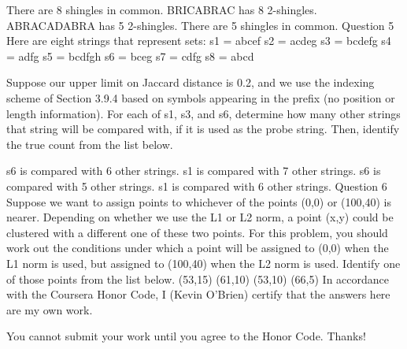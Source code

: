 There are 8 shingles in common.
BRICABRAC has 8 2-shingles.
ABRACADABRA has 5 2-shingles.
There are 5 shingles in common.
Question 5
Here are eight strings that represent sets:
s1 = abcef
s2 = acdeg
s3 = bcdefg
s4 = adfg
s5 = bcdfgh
s6 = bceg
s7 = cdfg
s8 = abcd

Suppose our upper limit on Jaccard distance is 0.2, and we use the indexing scheme of Section 3.9.4 based on symbols appearing in the prefix (no position or length information). For each of s1, s3, and s6, determine how many other strings that string will be compared with, if it is used as the probe string. Then, identify the true count from the list below.

s6 is compared with 6 other strings.
s1 is compared with 7 other strings.
s6 is compared with 5 other strings.
s1 is compared with 6 other strings.
Question 6
Suppose we want to assign points to whichever of the points (0,0) or (100,40) is nearer. Depending on whether we use the L1 or L2 norm, a point (x,y) could be clustered with a different one of these two points. For this problem, you should work out the conditions under which a point will be assigned to (0,0) when the L1 norm is used, but assigned to (100,40) when the L2 norm is used. Identify one of those points from the list below.
(53,15)
(61,10)
(53,10)
(66,5)
In accordance with the Coursera Honor Code, I (Kevin O'Brien) certify that the answers here are my own work.
       
You cannot submit your work until you agree to the Honor Code. Thanks!

